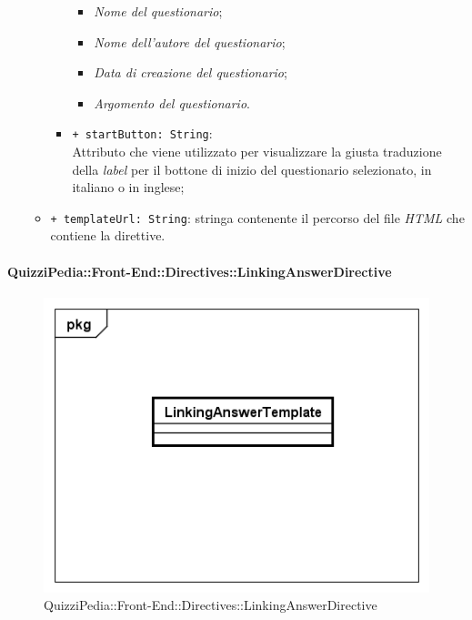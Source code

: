\begin{itemize}
\begin{itemize}
\begin{itemize}
					\begin{itemize}
						\item \textit{Nome del questionario};
						\item \textit{Nome dell'autore del questionario};
						\item \textit{Data di creazione del questionario};
						\item \textit{Argomento del questionario}.
					\end{itemize}
					\item \texttt{+ startButton: String}: \\ Attributo che viene utilizzato per visualizzare la giusta traduzione della \textit{label} per il bottone di inizio del questionario selezionato, in italiano o in inglese; 
				\end{itemize}
				\item \texttt{+ templateUrl: String}: stringa contenente il percorso del file \textit{HTML} che contiene la direttive.
			\end{itemize}
		\end{itemize}
		
		\paragraph{QuizziPedia::Front-End::Directives::LinkingAnswerDirective}
		
		\label{QuizziPedia::Front-End::Directives::LinkingAnswerDirective}
		
		\begin{figure}[ht]
			\centering
			\includegraphics[scale=0.5,keepaspectratio]{UML/Classi/Front-End/QuizziPedia_Front-end_Templates_LinkingAnswerTemplate.png}
			\caption{QuizziPedia::Front-End::Directives::LinkingAnswerDirective}
		\end{figure} \FloatBarrier		
		
